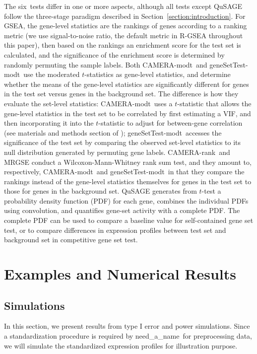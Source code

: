 \documentclass[useAMS,usenatbib, galley]{biom}
\newcommand{\OurMethod}{need\_a\_name}
\newcommand{\HowmanyTest}{six}
\newcommand{\CMR}{CAMERA-rank}
\newcommand{\CMT}{CAMERA-modt}
\newcommand{\gent}{geneSetTest-modt}
\begin{document}
	The \HowmanyTest~tests differ in one or more aspects, although all tests except QuSAGE follow the three-stage paradigm described in Section~\ref{section:introduction}. For GSEA, the gene-level statistics are the rankings of genes according to a ranking metric (we use signal-to-noise ratio, the default metric in R-GSEA throughout this paper), then based on the rankings an enrichment score for the test set is calculated, and the significance of the enrichment score is determined by randomly permuting the sample labels. Both \CMT~and \gent~use the moderated $t$-statistics \citep{Smyth2004moderated} as gene-level statistics, and determine whether the means of the gene-level statistics are significantly different for genes in the test set versus genes in the background set. The difference is how they evaluate the set-level statistics: \CMT~uses a $t$-statistic that allows the gene-level statistics in the test set to be correlated by first estimating a VIF, and then incorporating it into the $t$-statistic to adjust for between-gene correlation (see materials and methods section of \cite{wu2012camera}); \gent~accesses the significance of the test set by comparing the observed set-level statistics to its null distribution generated by permuting gene labels. \CMR~and MRGSE conduct a Wilcoxon-Mann-Whitney rank sum test, and they amount to, respectively,  \CMT~and \gent~in that they compare the rankings instead of the gene-level statistics themselves for genes in the test set to those for genes in the background set. QuSAGE generates from $t$-test a probability density function (PDF) for each gene, combines the individual PDFs using convolution, and quantifies gene-set activity with a complete PDF. The complete PDF can be used to compare a baseline value for self-contained gene set test, or to compare differences in expression profiles between test set and background set in competitive gene set test.  
	
	
	
	\section{Examples and Numerical Results}\label{section:results}
	
	\subsection{Simulations}\label{subsection:simulation}
	In this section, we present results from type I error and power simulations. Since a standardization procedure is required by \OurMethod~for preprocessing data, we will simulate the standardized expression profiles for illustration purpose. 
	
\end{document}
